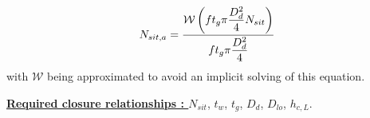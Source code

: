 \begin{equation}
N_{sit,a} = \frac{\mathcal{W}\left( f t_{g} \pi \dfrac{D_{d}^{2}}{4} N_{sit} \right)}{f t_{g} \pi \dfrac{D_{d}^{2}}{4}}
\end{equation}
with $\mathcal{W}$ being approximated to avoid an implicit solving of this equation.

\npar

\textbf{\underline{Required closure relationships : }} $N_{sit}$, $t_{w}$, $t_{g}$, $D_{d}$, $D_{lo}$, $h_{c,L}$. 




